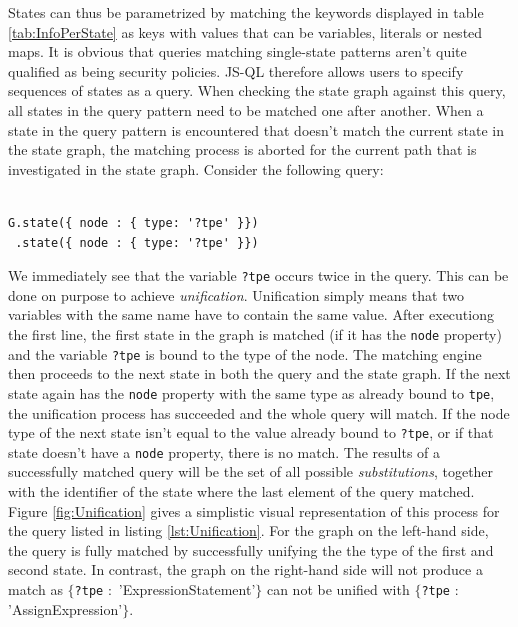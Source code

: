 \noindent States can thus be parametrized by matching the keywords displayed in table \ref{tab:InfoPerState} as keys with values that can be variables, literals or nested maps. It is obvious that queries matching single-state patterns aren't quite qualified as being security policies. JS-QL therefore allows users to specify sequences of states as a query. When checking the state graph against this query, all states in the query pattern need to be matched one after another. When a state in the query pattern is encountered that doesn't match the current state in the state graph, the matching process is aborted for the current path that is investigated in the state graph. Consider the following query:

\begin{lstlisting}[label={lst:Unification},language=JSQL,caption=Unification in JS-QL,mathescape=true]  % float=t?

G.state({ node : { type: '?tpe' }})
 .state({ node : { type: '?tpe' }})
\end{lstlisting}

\noindent We immediately see that the variable \texttt{?tpe} occurs twice in the query. This can be done on purpose to achieve \textit{unification}. Unification simply means that two variables with the same name have to contain the same value. After executiong the first line, the first state in the graph is matched (if it has the \texttt{node} property) and the variable \texttt{?tpe} is bound to the type of the node. The matching engine then proceeds to the next state in both the query and the state graph. If the next state again has the \texttt{node} property with the same type as already bound to \texttt{tpe}, the unification process has succeeded and the whole query will match. If the node type of the next state isn't equal to the value already bound to \texttt{?tpe}, or if that state doesn't have a \texttt{node} property, there is no match. The results of a successfully matched query will be the set of all possible \textit{substitutions}, together with the identifier of the state where the last element of the query matched. Figure \ref{fig:Unification} gives a simplistic visual representation of this process for the query listed in listing \ref{lst:Unification}. For the graph on the left-hand side, the query is fully matched by successfully unifying the the type of the first and second state. In contrast, the graph on the right-hand side will not produce a match as $\{$\texttt{?tpe} $:$ 'ExpressionStatement'$\}$ can not be unified with $\{$\texttt{?tpe} $:$ 'AssignExpression'$\}$.

